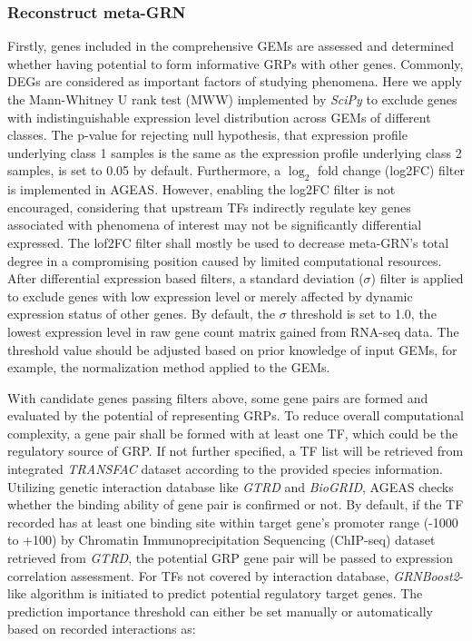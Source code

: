 \documentclass[fleqn,10pt]{wlscirep}
\begin{document}
    \subsubsection*{Reconstruct meta-GRN}
      Firstly, genes included in the comprehensive GEMs are assessed and determined whether having potential to form informative GRPs with other genes.
      Commonly, DEGs are considered as important factors of studying phenomena.
      Here we apply the Mann-Whitney U rank test (MWW) implemented by \emph{SciPy}\cite{2020SciPy-NMeth} to exclude genes with indistinguishable expression level distribution across GEMs of different classes.
      The p-value for rejecting null hypothesis, that expression profile underlying class 1 samples is the same as the expression profile underlying class 2 samples, is set to 0.05 by default.
      Furthermore, a $\log_2$ fold change (log2FC) filter is implemented in AGEAS.
      However, enabling the log2FC filter is not encouraged, considering that upstream TFs indirectly regulate key genes associated with phenomena of interest may not be significantly differential expressed.
      The lof2FC filter shall mostly be used to decrease meta-GRN's total degree in a compromising position caused by limited computational resources.
      After differential expression based filters, a standard deviation ($\sigma$) filter is applied to exclude genes with low expression level or merely affected by dynamic expression status of other genes.
      By default, the $\sigma$ threshold is set to 1.0, the lowest expression level in raw gene count matrix gained from RNA-seq data.
      The threshold value should be adjusted based on prior knowledge of input GEMs, for example, the normalization method applied to the GEMs.

      With candidate genes passing filters above, some gene pairs are formed and evaluated by the potential of representing GRPs.
      To reduce overall computational complexity, a gene pair shall be formed with at least one TF, which could be the regulatory source of GRP.
      If not further specified, a TF list will be retrieved from integrated \emph{TRANSFAC}\cite{transfac} dataset according to the provided species information.
      Utilizing genetic interaction database like \emph{GTRD}\cite{gkaa1057} and \emph{BioGRID}\cite{biogrid}, AGEAS checks whether the binding ability of gene pair is confirmed or not.
      By default, if the TF recorded has at least one binding site within target gene's promoter range (-1000 to +100) by Chromatin Immunoprecipitation Sequencing (ChIP-seq) dataset retrieved from \emph{GTRD}\cite{gkaa1057}, the potential GRP gene pair will be passed to expression correlation assessment.
      For TFs not covered by interaction database, \emph{GRNBoost2}\cite{grnboost2}-like algorithm is initiated to predict potential regulatory target genes.
      The prediction importance threshold can either be set manually or automatically based on recorded interactions as:
\end{document}
